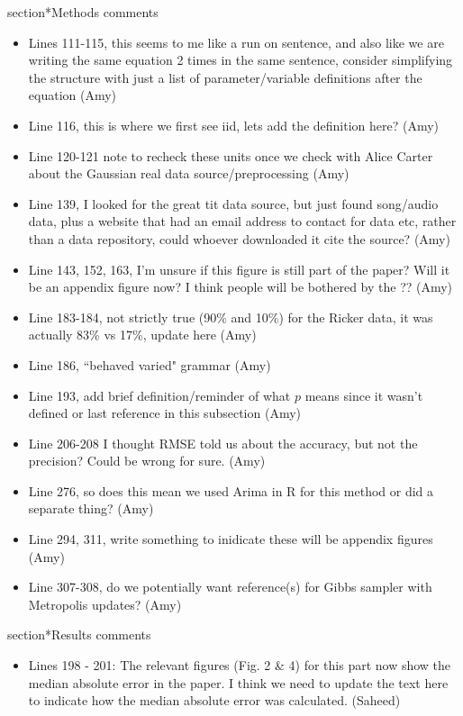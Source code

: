section*{Methods comments}
\begin{itemize}
    \item Lines 111-115, this seems to me like a run on sentence, and also like we are writing the same equation 2 times in the same sentence, consider simplifying the structure with just a list of parameter/variable definitions after the equation (Amy)
    \item Line 116, this is where we first see iid, lets add the definition here? (Amy)
    \item Line 120-121 note to recheck these units once we check with Alice Carter about the Gaussian real data source/preprocessing (Amy)
    \item Line 139, I looked for the great tit data source, but just found song/audio data, plus a website that had an email address to contact for data etc, rather than a data repository, could whoever downloaded it cite the source? (Amy)
    \item Line 143, 152, 163, I'm unsure if this figure is still part of the paper? Will it be an appendix figure now? I think people will be bothered by the ?? (Amy)
    \item Line 183-184, not strictly true (90\% and 10\%) for the Ricker data, it was actually 83\% vs 17\%, update here (Amy)
    \item Line 186, ``behaved varied" grammar (Amy)
    \item Line 193, add brief definition/reminder of what $p$ means since it wasn't defined or last reference in this subsection (Amy)
    \item Line 206-208 I thought RMSE told us about the accuracy, but not the precision? Could be wrong for sure. (Amy)
    \item Line 276, so does this mean we used Arima in R for this method or did a separate thing? (Amy)
    \item Line 294, 311, write something to inidicate these will be appendix figures (Amy)
    \item Line 307-308, do we potentially want reference(s) for Gibbs sampler with Metropolis updates? (Amy)
\end{itemize}


section*{Results comments}
\begin{itemize}
    \item Lines 198 - 201: The relevant figures (Fig. 2 & 4) for this part now show the median absolute error in the paper. I think we need to update the text here to indicate how the median absolute error was calculated. (Saheed)
\end{itemize}

